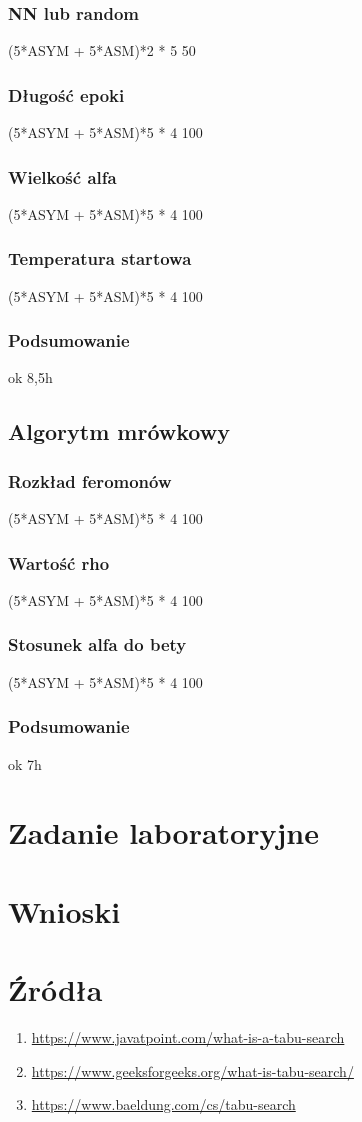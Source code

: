 \documentclass{article}
\begin{document}
      \subsubsection{NN lub random}
        (5*ASYM + 5*ASM)*2 * 5 50
      \subsubsection{Długość epoki}
        (5*ASYM + 5*ASM)*5 * 4 100
      \subsubsection{Wielkość alfa}
        (5*ASYM + 5*ASM)*5 * 4 100
      \subsubsection{Temperatura startowa}
        (5*ASYM + 5*ASM)*5 * 4 100
      \subsubsection{Podsumowanie}ok 8,5h
    \subsection{Algorytm mrówkowy}
      \subsubsection{Rozkład feromonów}
        (5*ASYM + 5*ASM)*5 * 4 100
      \subsubsection{Wartość rho}
        (5*ASYM + 5*ASM)*5 * 4 100
      \subsubsection{Stosunek alfa do bety}
        (5*ASYM + 5*ASM)*5 * 4 100
      \subsubsection{Podsumowanie}ok 7h
    \section{Zadanie laboratoryjne}


    \section{Wnioski}


    \section{Źródła}
      \begin{enumerate}[label=\arabic*.]
        \item \url{https://www.javatpoint.com/what-is-a-tabu-search}
        \item \url{https://www.geeksforgeeks.org/what-is-tabu-search/}
        \item \url{https://www.baeldung.com/cs/tabu-search}
      \end{enumerate}
\end{document}
